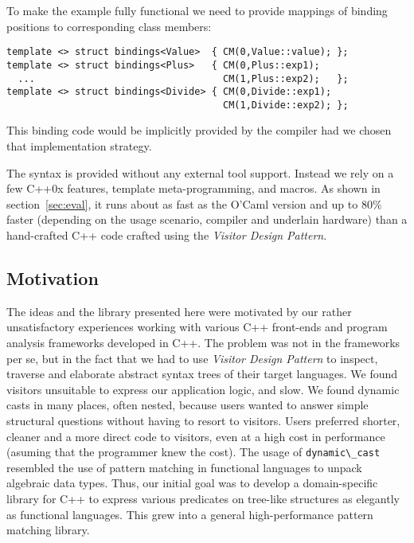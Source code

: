 \documentclass[preprint]{sigplanconf}
\makeatletter
\DeclareRobustCommand{\code}[1]{{\lstinline[breaklines=false,escapechar=@]{#1}}}
\makeatother
\begin{document}
To make the example fully functional we need to provide mappings of binding 
positions to corresponding class members:

\begin{lstlisting}[keepspaces,columns=flexible]
template <> struct bindings<Value>  { CM(0,Value::value); };
template <> struct bindings<Plus>   { CM(0,Plus::exp1); 
  ...                                 CM(1,Plus::exp2);   };
template <> struct bindings<Divide> { CM(0,Divide::exp1); 
                                      CM(1,Divide::exp2); };
\end{lstlisting}

This binding code would be implicitly provided by the compiler had
we chosen that implementation strategy.

The syntax is provided without any external tool support.
Instead we rely on a few C++0x 
features\cite{C++0x}, template meta-programming, and macros. As
shown in section~\ref{sec:eval}, it runs about as fast as the O'Caml version
and up to 80\% faster (depending on the usage 
scenario, compiler and underlain hardware) than a hand-crafted C++ code crafted using the 
\emph{Visitor Design Pattern}.

\subsection{Motivation}


The ideas and the library presented here were motivated by our rather 
unsatisfactory experiences working with various C++ front-ends and program 
analysis frameworks developed in C++\cite{Pivot09,Phoenix,Clang,Lise}. The 
problem was not in the frameworks per se, but in the fact that we had to use 
\emph{Visitor Design Pattern}\cite{DesignPatterns1993} to inspect, traverse and 
elaborate abstract syntax trees of their target languages. We found 
visitors unsuitable to express our application logic, and slow. 
We found dynamic casts in many places, often nested, because users
wanted to answer simple 
structural questions without having to resort to visitors.
Users preferred shorter, cleaner and a more direct code to visitors,
even at a high cost in performance (asuming that the programmer knew the cost).
The usage of \code{dynamic\_cast} resembled the use of 
pattern matching in functional languages to unpack algebraic data types. 
Thus, our initial goal was to develop a 
domain-specific library for C++ to express various 
predicates on tree-like structures as elegantly as functional languages.
This grew into a general high-performance pattern matching library.
\end{document}
